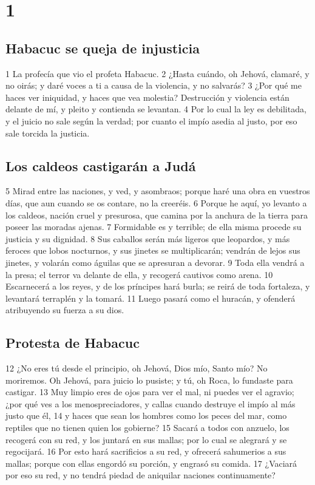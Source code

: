 
\chapter{1}

\section*{Habacuc se queja de injusticia}

1 La profecía que vio el profeta Habacuc.
2 ¿Hasta cuándo, oh Jehová, clamaré, y no oirás; y daré voces a ti a causa de la violencia, y no salvarás?
3 ¿Por qué me haces ver iniquidad, y haces que vea molestia? Destrucción y violencia están delante de mí, y pleito y contienda se levantan.
4 Por lo cual la ley es debilitada, y el juicio no sale según la verdad; por cuanto el impío asedia al justo, por eso sale torcida la justicia.

\section*{Los caldeos castigarán a Judá}

5 Mirad entre las naciones, y ved, y asombraos; porque haré una obra en vuestros días, que aun cuando se os contare, no la creeréis. 
6 Porque he aquí, yo levanto a los caldeos, nación cruel y presurosa, que camina por la anchura de la tierra para poseer las moradas ajenas.
7 Formidable es y terrible; de ella misma procede su justicia y su dignidad.
8 Sus caballos serán más ligeros que leopardos, y más feroces que lobos nocturnos, y sus jinetes se multiplicarán; vendrán de lejos sus jinetes, y volarán como águilas que se apresuran a devorar.
9 Toda ella vendrá a la presa; el terror va delante de ella, y recogerá cautivos como arena.
10 Escarnecerá a los reyes, y de los príncipes hará burla; se reirá de toda fortaleza, y levantará terraplén y la tomará.
11 Luego pasará como el huracán, y ofenderá atribuyendo su fuerza a su dios.

\section*{Protesta de Habacuc}

12 ¿No eres tú desde el principio, oh Jehová, Dios mío, Santo mío? No moriremos. Oh Jehová, para juicio lo pusiste; y tú, oh Roca, lo fundaste para castigar.
13 Muy limpio eres de ojos para ver el mal, ni puedes ver el agravio; ¿por qué ves a los menospreciadores, y callas cuando destruye el impío al más justo que él,
14 y haces que sean los hombres como los peces del mar, como reptiles que no tienen quien los gobierne?
15 Sacará a todos con anzuelo, los recogerá con su red, y los juntará en sus mallas; por lo cual se alegrará y se regocijará.
16 Por esto hará sacrificios a su red, y ofrecerá sahumerios a sus mallas; porque con ellas engordó su porción, y engrasó su comida.
17 ¿Vaciará por eso su red, y no tendrá piedad de aniquilar naciones continuamente?

